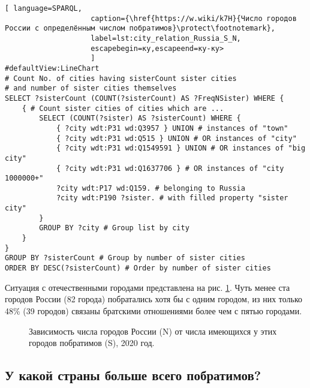 \begin{lstlisting}[ language=SPARQL, 
                    caption={\href{https://w.wiki/k7H}{Число городов России с определённым числом побратимов}\protect\footnotemark},
                    label=lst:city_relation_Russia_S_N, 
                    escapebegin=ку,escapeend=ку-ку>
                    ]
#defaultView:LineChart                                                   
# Count No. of cities having sisterCount sister cities  
# and number of sister cities themselves
SELECT ?sisterCount (COUNT(?sisterCount) AS ?FreqNSister) WHERE {                                                                                  
	{ # Count sister cities of cities which are ...
		SELECT (COUNT(?sister) AS ?sisterCount) WHERE {    
			{ ?city wdt:P31 wd:Q3957 } UNION # instances of "town"
			{ ?city wdt:P31 wd:Q515 } UNION # OR instances of "city"
			{ ?city wdt:P31 wd:Q1549591 } UNION # OR instances of "big city"
			{ ?city wdt:P31 wd:Q1637706 } # OR instances of "city 1000000+"
			?city wdt:P17 wd:Q159. # belonging to Russia
			?city wdt:P190 ?sister. # with filled property "sister city"
		}
		GROUP BY ?city # Group list by city                             
	}
}
GROUP BY ?sisterCount # Group by number of sister cities
ORDER BY DESC(?sisterCount) # Order by number of sister cities                                  
\end{lstlisting}

Ситуация с отечественными городами представлена на рис. \ref{fig:city_relation_Russia_S_N}. Чуть менее ста городов России (82 города) побратались хотя бы с одним городом, из них только 48\% (39 городов) связаны братскими отношениями более чем с пятью городами.

\begin{figure}
{
\setlength{\fboxsep}{0pt}%
\setlength{\fboxrule}{1pt}%
}
  \caption{Зависимость числа городов России (N) от числа имеющихся у этих городов побратимов (S), 2020 год.}
  \label{fig:city_relation_Russia_S_N}
\end{figure}

\subsection{У какой страны больше всего побратимов?}

